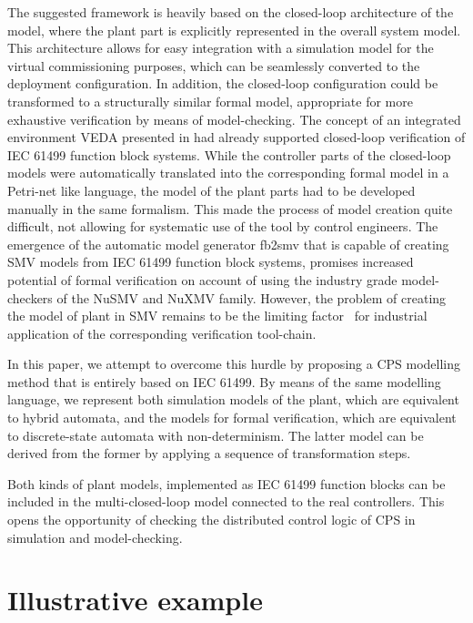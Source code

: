 \begin{bibunit}
The suggested framework is heavily based on the closed-loop architecture of the model, where the plant part is explicitly represented in the overall system model. This architecture allows for easy integration with a simulation model for the virtual commissioning purposes, which can be seamlessly converted to the deployment configuration. In addition, the closed-loop configuration could be transformed to a structurally similar formal model, appropriate for more exhaustive verification by means of model-checking.   
The concept of an integrated environment VEDA presented in \cite{vyatkin2003verification} had already supported closed-loop verification of IEC 61499 function block systems. While the controller parts of the closed-loop models were automatically translated into the corresponding formal model in a Petri-net like language, the model of the plant parts had to be developed manually in the same formalism. 
This made the process of model creation quite difficult, not allowing for systematic use of the tool by control engineers. 
The emergence of the automatic model generator fb2smv \cite{fb2smv} that is capable of creating SMV models from IEC 61499 function block systems, promises increased potential of formal verification on account of using the industry grade model-checkers of the NuSMV \cite{cimatti2000nusmv} and NuXMV family. 
However, the problem of creating the model of plant in SMV remains to be the limiting factor~\cite{sinha2019survey} for industrial application of the corresponding verification tool-chain.

In this paper, we attempt to overcome this hurdle by proposing a CPS modelling method that is entirely based on IEC 61499. By means of the same modelling language, we represent both simulation models of the plant, which are equivalent to hybrid automata, and the models for formal verification, which are equivalent to discrete-state automata with non-determinism. 
The latter model can be derived from the former by applying a sequence of transformation steps. 

Both kinds of plant models, implemented as IEC 61499 function blocks can be included in the multi-closed-loop model connected to the real controllers. This opens the opportunity of checking the distributed control logic of CPS in simulation and model-checking.  

\section{Illustrative example}


\end{bibunit}
